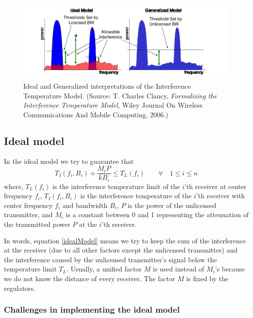 \documentclass[12pt]{article}
\begin{document}
\begin{figure}
\centering
\includegraphics[width = \linewidth]{interferenceTemperatureModels.png}
\caption{Ideal and Generalized interpretations of the Interference Temperature Model. (Source: T. Charles Clancy, \emph{Formalizing the Interference Temperature Model}, Wiley Journal On Wireless Communications And Mobile Computing, 2006.)}
\end{figure}




\subsection*{Ideal model}

In the ideal model we try to guarantee that
\begin{equation}
    T_I(f_i,B_i) + \frac{M_iP}{kB_i} \leq T_L(f_i) \qquad \forall \quad 1 \leq i \leq n \label{idealModel}
\end{equation}
where, $T_L(f_i)$ is the interference temperature limit of the $i$'th receiver at center frequency $f_i$, $T_I(f_i,B_i)$ is  the interference temperature of the $i$'th receiver with center frequency $f_i$ and bandwidth $B_i$, $P$ is the power of the unlicensed transmitter, and $M_i$ is a constant between 0 and 1 representing the attenuation of the  transmitted power $P$ at the $i$'th receiver.

In words, equation \eqref{idealModel} means we try to keep the sum of the interference at the receiver (due to all other factors except the unlicensed transmitter) and the interference caused by the unlicensed transmitter's signal below the temperature limit $T_L$. Usually, a unified factor $M$ is used instead of $M_i$'s because we do not know the distance of every receiver. The factor $M$ is fixed by the regulators.

\subsubsection*{Challenges in implementing the ideal model}
\end{document}
